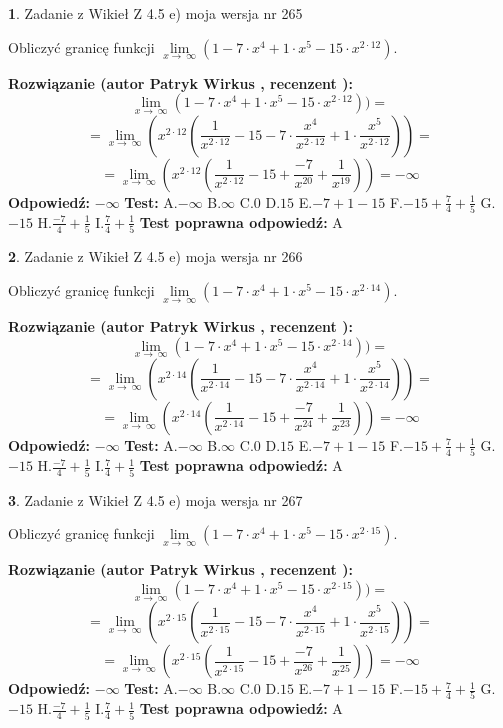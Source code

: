 \documentclass[12pt, a4paper]{article}
\theoremstyle{definition} %
\newtheorem{zad}{}
\newcommand{\zadStart}[1]{\begin{zad}#1\newline}
\newcommand{\zadStop}{\end{zad}}
\newcommand{\rozwStart}[2]{\noindent \textbf{Rozwiązanie (autor #1 , recenzent #2): }\newline}
\newcommand{\rozwStop}{\newline}
\newcommand{\odpStart}{\noindent \textbf{Odpowiedź:}\newline}
\newcommand{\odpStop}{\newline}
\newcommand{\testStart}{\noindent \textbf{Test:}\newline}
\newcommand{\testStop}{\newline}
\newcommand{\kluczStart}{\noindent \textbf{Test poprawna odpowiedź:}\newline}
\newcommand{\kluczStop}{\newline}
\begin{document}
\zadStart{Zadanie z Wikieł Z 4.5 e) moja wersja nr 265}



Obliczyć granicę funkcji  $\lim\limits_{x\to\ \infty}(1 - 7 \cdot x^{4}+1 \cdot x^{5}- 15 \cdot x^{2\cdot12})$.
\zadStop
\rozwStart{Patryk Wirkus}{}
$$\lim\limits_{x\to\ \infty}(1 - 7 \cdot x^{4}+1 \cdot x^{5}- 15 \cdot x^{2\cdot12}))=$$
$$=\lim\limits_{x\to\ \infty}(x^{2\cdot12}(\frac{1}{x^{2\cdot12}}-15 -7 \cdot \frac{x^{4}}{x^{2\cdot12}}+1 \cdot \frac{x^{5}}{x^{2\cdot12}}))=$$
$$=\lim\limits_{x\to\ \infty}(x^{2\cdot12}(\frac{1}{x^{2\cdot12}}-15 + \frac{-7}{x^{20}}+ \frac{1}{x^{19}}))=-\infty$$
\rozwStop
\odpStart
$-\infty$
\odpStop
\testStart
A.$-\infty$ B.$\infty$ C.$0$ D.$15$ E.$-7 + 1 - 15$
F.$-15+\frac{7}{4}+\frac{1}{5}$ G.$-15$
H.$\frac{-7}{4}+\frac{1}{5}$
I.$\frac{7}{4}+\frac{1}{5}$
\testStop
\kluczStart
A
\kluczStop



\zadStart{Zadanie z Wikieł Z 4.5 e) moja wersja nr 266}



Obliczyć granicę funkcji  $\lim\limits_{x\to\ \infty}(1 - 7 \cdot x^{4}+1 \cdot x^{5}- 15 \cdot x^{2\cdot14})$.
\zadStop
\rozwStart{Patryk Wirkus}{}
$$\lim\limits_{x\to\ \infty}(1 - 7 \cdot x^{4}+1 \cdot x^{5}- 15 \cdot x^{2\cdot14}))=$$
$$=\lim\limits_{x\to\ \infty}(x^{2\cdot14}(\frac{1}{x^{2\cdot14}}-15 -7 \cdot \frac{x^{4}}{x^{2\cdot14}}+1 \cdot \frac{x^{5}}{x^{2\cdot14}}))=$$
$$=\lim\limits_{x\to\ \infty}(x^{2\cdot14}(\frac{1}{x^{2\cdot14}}-15 + \frac{-7}{x^{24}}+ \frac{1}{x^{23}}))=-\infty$$
\rozwStop
\odpStart
$-\infty$
\odpStop
\testStart
A.$-\infty$ B.$\infty$ C.$0$ D.$15$ E.$-7 + 1 - 15$
F.$-15+\frac{7}{4}+\frac{1}{5}$ G.$-15$
H.$\frac{-7}{4}+\frac{1}{5}$
I.$\frac{7}{4}+\frac{1}{5}$
\testStop
\kluczStart
A
\kluczStop



\zadStart{Zadanie z Wikieł Z 4.5 e) moja wersja nr 267}



Obliczyć granicę funkcji  $\lim\limits_{x\to\ \infty}(1 - 7 \cdot x^{4}+1 \cdot x^{5}- 15 \cdot x^{2\cdot15})$.
\zadStop
\rozwStart{Patryk Wirkus}{}
$$\lim\limits_{x\to\ \infty}(1 - 7 \cdot x^{4}+1 \cdot x^{5}- 15 \cdot x^{2\cdot15}))=$$
$$=\lim\limits_{x\to\ \infty}(x^{2\cdot15}(\frac{1}{x^{2\cdot15}}-15 -7 \cdot \frac{x^{4}}{x^{2\cdot15}}+1 \cdot \frac{x^{5}}{x^{2\cdot15}}))=$$
$$=\lim\limits_{x\to\ \infty}(x^{2\cdot15}(\frac{1}{x^{2\cdot15}}-15 + \frac{-7}{x^{26}}+ \frac{1}{x^{25}}))=-\infty$$
\rozwStop
\odpStart
$-\infty$
\odpStop
\testStart
A.$-\infty$ B.$\infty$ C.$0$ D.$15$ E.$-7 + 1 - 15$
F.$-15+\frac{7}{4}+\frac{1}{5}$ G.$-15$
H.$\frac{-7}{4}+\frac{1}{5}$
I.$\frac{7}{4}+\frac{1}{5}$
\testStop
\kluczStart
A
\kluczStop
\end{document}

